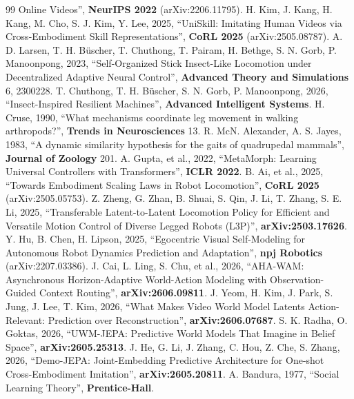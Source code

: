 \documentclass[12pt,a4paper,oneside]{report}
\begin{document}
\begin{thebibliography}{99}
    Online Videos'', \textbf{NeurIPS 2022} (arXiv:2206.11795).
   H. Kim, J. Kang, H. Kang, M. Cho, S. J. Kim, Y. Lee, 2025, ``UniSkill: Imitating Human Videos
    via Cross-Embodiment Skill Representations'', \textbf{CoRL 2025} (arXiv:2505.08787).
   A. D. Larsen, T. H. B\"uscher, T. Chuthong, T. Pairam, H. Bethge, S. N. Gorb,
    P. Manoonpong, 2023, ``Self-Organized Stick Insect-Like Locomotion under Decentralized Adaptive Neural
    Control'', \textbf{Advanced Theory and Simulations} 6, 2300228.
   T. Chuthong, T. H. B\"uscher, S. N. Gorb, P. Manoonpong, 2026, ``Insect-Inspired
    Resilient Machines'', \textbf{Advanced Intelligent Systems}.
   H. Cruse, 1990, ``What mechanisms coordinate leg movement in walking arthropods?'',
    \textbf{Trends in Neurosciences} 13.
   R. McN. Alexander, A. S. Jayes, 1983, ``A dynamic similarity hypothesis for the gaits of
    quadrupedal mammals'', \textbf{Journal of Zoology} 201.
   A. Gupta, et al., 2022, ``MetaMorph: Learning Universal Controllers with Transformers'',
    \textbf{ICLR 2022}.
   B. Ai, et al., 2025, ``Towards Embodiment Scaling Laws in Robot Locomotion'', \textbf{CoRL
    2025} (arXiv:2505.05753).
   Z. Zheng, G. Zhan, B. Shuai, S. Qin, J. Li, T. Zhang, S. E. Li, 2025, ``Transferable
    Latent-to-Latent Locomotion Policy for Efficient and Versatile Motion Control of Diverse Legged Robots (L3P)'',
    \textbf{arXiv:2503.17626}.
   Y. Hu, B. Chen, H. Lipson, 2025, ``Egocentric Visual Self-Modeling for Autonomous Robot
    Dynamics Prediction and Adaptation'', \textbf{npj Robotics} (arXiv:2207.03386).
   J. Cai, L. Ling, S. Chu, et al., 2026, ``AHA-WAM: Asynchronous Horizon-Adaptive
    World-Action Modeling with Observation-Guided Context Routing'', \textbf{arXiv:2606.09811}.
   J. Yeom, H. Kim, J. Park, S. Jung, J. Lee, T. Kim, 2026, ``What Makes Video World Model
    Latents Action-Relevant: Prediction over Reconstruction'', \textbf{arXiv:2606.07687}.
   S. K. Radha, O. Goktas, 2026, ``UWM-JEPA: Predictive World Models That Imagine in
    Belief Space'', \textbf{arXiv:2605.25313}.
   J. He, G. Li, J. Zhang, C. Hou, Z. Che, S. Zhang, 2026, ``Demo-JEPA:
    Joint-Embedding Predictive Architecture for One-shot Cross-Embodiment Imitation'', \textbf{arXiv:2605.20811}.
   A. Bandura, 1977, ``Social Learning Theory'', \textbf{Prentice-Hall}.
\end{thebibliography}
\end{document}
